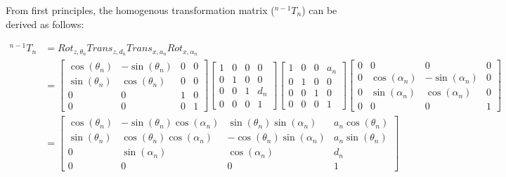 From first principles, the homogenous transformation matrix ($^{n-1}T_{n}$) can be derived as follows:

\begin{equation}
    \begin{split}
        ^{n-1}T_{n} & = Rot_{z, \theta_n} Trans_{z, d_n} Trans_{x, a_n} Rot_{x, \alpha_n}                                   \\
                    & = \begin{bmatrix}
                            \cos(\theta_n) & -\sin(\theta_n) & 0 & 0 \\
                            \sin(\theta_n) & \cos(\theta_n)  & 0 & 0 \\
                            0              & 0               & 1 & 0 \\
                            0              & 0               & 0 & 1
                        \end{bmatrix}
        \begin{bmatrix}
            1 & 0 & 0 & 0   \\
            0 & 1 & 0 & 0   \\
            0 & 0 & 1 & d_n \\
            0 & 0 & 0 & 1
        \end{bmatrix}
        \begin{bmatrix}
            1 & 0 & 0 & a_n \\
            0 & 1 & 0 & 0   \\
            0 & 0 & 1 & 0   \\
            0 & 0 & 0 & 1
        \end{bmatrix}
        \begin{bmatrix}
            0 & 0              & 0               & 0 \\
            0 & \cos(\alpha_n) & -\sin(\alpha_n) & 0 \\
            0 & \sin(\alpha_n) & \cos(\alpha_n)  & 0 \\
            0 & 0              & 0               & 1
        \end{bmatrix}                                                                            \\
                    & = \begin{bmatrix}
                            \cos(\theta_n) & -\sin(\theta_n)\cos(\alpha_n) & \sin(\theta_n)\sin(\alpha_n)  & a_n \cos(\theta_n) \\
                            \sin(\theta_n) & \cos(\theta_n)\cos(\alpha_n)  & -\cos(\theta_n)\sin(\alpha_n) & a_n \sin(\theta_n) \\
                            0              & \sin(\alpha_n)                & \cos(\alpha_n)                & d_n                \\
                            0              & 0                             & 0                             & 1
                        \end{bmatrix}
    \end{split}
    \label{equation:DH Matrix}
\end{equation}

